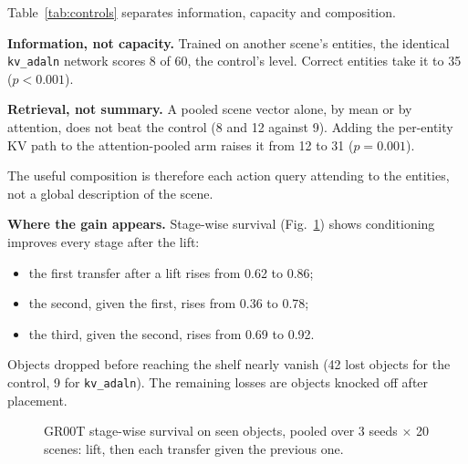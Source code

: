 \documentclass[letterpaper, 10pt, journal, twoside]{IEEEtran}
\newcommand{\arm}[1]{\texttt{#1}}
\begin{document}
Table~\ref{tab:controls} separates information, capacity and composition.

\textbf{Information, not capacity.} Trained on another scene's entities, the
identical \arm{kv\_adaln} network scores 8 of 60, the control's level.
Correct entities take it to 35 ($p<0.001$).

\textbf{Retrieval, not summary.} A pooled scene vector alone, by mean or by
attention, does not beat the control (8 and 12 against 9). Adding the
per-entity KV path to the attention-pooled arm raises it from 12 to 31
($p=0.001$).

The useful composition is therefore each action query attending to the
entities, not a global description of the scene.

\textbf{Where the gain appears.} Stage-wise survival (Fig.~\ref{fig:stages})
shows conditioning improves every stage after the lift:
\begin{itemize}
  \item the first transfer after a lift rises from 0.62 to 0.86;
  \item the second, given the first, rises from 0.36 to 0.78;
  \item the third, given the second, rises from 0.69 to 0.92.
\end{itemize}
Objects dropped before reaching the shelf nearly vanish (42 lost objects for
the control, 9 for \arm{kv\_adaln}). The remaining losses are objects knocked
off after placement.

\begin{figure}[t]
\centering
{}
\caption{GR00T stage-wise survival on seen objects, pooled over 3 seeds
$\times$ 20 scenes: lift, then each transfer given the previous one.}
\label{fig:stages}
\end{figure}
\end{document}
